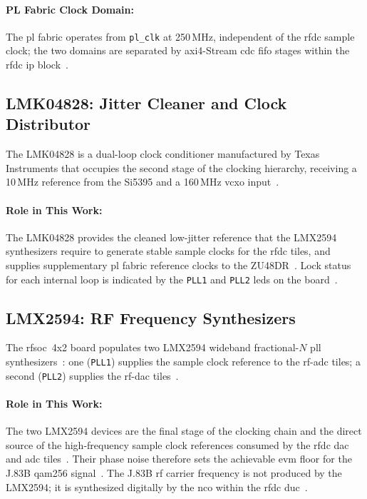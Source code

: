 \paragraph{PL Fabric Clock Domain:}
The \ac{pl} fabric operates from \texttt{pl\_clk} at 250\,MHz,
independent of the \ac{rfdc} sample clock; the two domains are
separated by \ac{axi}4-Stream \ac{cdc} \ac{fifo} stages within the
\ac{rfdc} \ac{ip} block~\cite{AMD_PG269}.


\subsection{LMK04828: Jitter Cleaner and Clock Distributor}
\label{subsec:lmk04828_background}

The LMK04828 is a dual-loop clock conditioner manufactured by Texas
Instruments that occupies the second stage of the clocking hierarchy,
receiving a 10\,MHz reference from the Si5395 and a 160\,MHz
\ac{vcxo} input~\cite{TI_LMK04828,RealDigital_A6}.

\paragraph{Role in This Work:}
The LMK04828 provides the cleaned low-jitter reference that the
LMX2594 synthesizers require to generate stable sample clocks for
the \ac{rfdc} tiles, and supplies supplementary \ac{pl} fabric
reference clocks to the ZU48DR~\cite{RealDigital_A6}.
Lock status for each internal loop is indicated by the \texttt{PLL1}
and \texttt{PLL2} \acp{led} on the board~\cite{RealDigital_A6}.


\subsection{LMX2594: RF Frequency Synthesizers}
\label{subsec:lmx2594_background}

The \ac{rfsoc}~4x2 board populates two LMX2594 wideband
fractional-$N$ \ac{pll} synthesizers~\cite{TI_LMX2594}: one
(\texttt{PLL1}) supplies the sample clock reference to the
\ac{rf}-\ac{adc} tiles; a second (\texttt{PLL2}) supplies the
\ac{rf}-\ac{dac} tiles~\cite{RealDigital_A6}.

\paragraph{Role in This Work:}
The two LMX2594 devices are the final stage of the clocking chain
and the direct source of the high-frequency sample clock references
consumed by the \ac{rfdc} \ac{dac} and \ac{adc}
tiles~\cite{RealDigital_A6}.
Their phase noise therefore sets the achievable \ac{evm} floor for
the J.83B \ac{qam256} signal~\cite{proakis_dsp}.
The J.83B \ac{rf} carrier frequency is not produced by the LMX2594;
it is synthesized digitally by the \ac{nco} within the \ac{rfdc}
\ac{duc}~\cite{AMD_PG269}.


